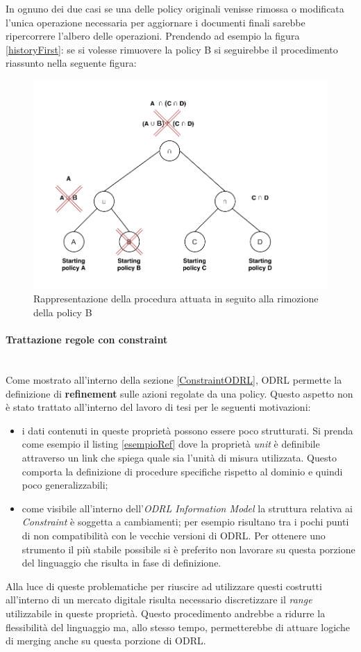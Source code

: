 \documentclass[12pt,a4paper,twoside]{book}
\begin{document}
In ognuno dei due casi se una delle policy originali venisse rimossa o modificata l'unica operazione necessaria per aggiornare i documenti finali sarebbe ripercorrere l'albero delle operazioni. Prendendo ad esempio la figura \ref{historyFirst}: se si volesse rimuovere la policy B si seguirebbe il procedimento riassunto nella seguente figura:
\begin{figure}[H]
\centering
\includegraphics[scale=.50]{../immagini/historySecond.pdf}
\caption{Rappresentazione della procedura attuata in seguito alla rimozione della policy B}
\label{historySecond}
\end{figure}
\paragraph{Trattazione regole con constraint}\mbox{}\\
Come mostrato all'interno della sezione \ref{ConstraintODRL}, ODRL permette la definizione di \textbf{refinement} sulle azioni regolate da una policy. Questo aspetto non è stato trattato all'interno del lavoro di tesi per le seguenti motivazioni:
\begin{itemize}
\item i dati contenuti in queste proprietà possono essere poco strutturati. Si prenda come esempio il listing \ref{esempioRef} dove la proprietà \textit{unit} è definibile attraverso un link che spiega quale sia l'unità di misura utilizzata. Questo comporta la definizione di procedure specifiche rispetto al dominio e quindi poco generalizzabili;
\item come visibile all'interno dell'\textit{ODRL Information Model}\cite{ODRLinfMod} la struttura relativa ai \textit{Constraint} è soggetta a cambiamenti; per esempio risultano tra i pochi punti di non compatibilità con le vecchie versioni di ODRL. Per ottenere uno strumento il più stabile possibile si è preferito non lavorare su questa porzione del linguaggio che risulta in fase di definizione. 
\end{itemize}
Alla luce di queste problematiche per riuscire ad utilizzare questi costrutti all'interno di un mercato digitale risulta necessario discretizzare il \textit{range} utilizzabile in queste proprietà. Questo procedimento andrebbe a ridurre la flessibilità del linguaggio ma, allo stesso tempo, permetterebbe di attuare logiche di merging anche su questa porzione di ODRL.  
\end{document}

